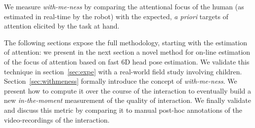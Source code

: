 \documentclass{sig-alternate}
\begin{document}
We measure \emph{with-me-ness} by comparing the attentional focus of the human
(as estimated in real-time by the robot) with the expected, {\it a priori}
targets of attention elicited by the task at hand.

The following sections expose the full methodology, starting with the estimation
of attention: we present in the next section a novel method for on-line estimation
of the focus of attention based on fast 6D head pose estimation. We validate
this technique in section~\ref{sec:expe} with a real-world field study involving
children. Section~\ref{sec:withmeness} formally introduce the concept of
\emph{with-me-ness}. We present how to compute it over the course of the
interaction to eventually build a new \emph{in-the-moment} measurement of the
quality of interaction. We finally validate and discuss this metric by comparing
it to manual post-hoc annotations of the video-recordings of the interaction.

%
%
%
\end{document}
